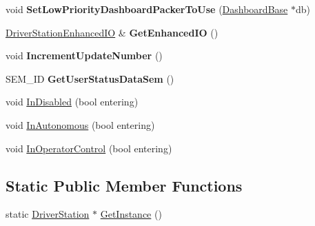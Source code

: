 \begin{DoxyCompactItemize}
\item 
\hypertarget{classDriverStation_a693f723f6be659c9385fad63c17d157d}{
void {\bfseries SetLowPriorityDashboardPackerToUse} (\hyperlink{classDashboardBase}{DashboardBase} $\ast$db)}
\label{classDriverStation_a693f723f6be659c9385fad63c17d157d}

\item 
\hypertarget{classDriverStation_a94c7b5fce697280e73b30dce57bbb917}{
\hyperlink{classDriverStationEnhancedIO}{DriverStationEnhancedIO} \& {\bfseries GetEnhancedIO} ()}
\label{classDriverStation_a94c7b5fce697280e73b30dce57bbb917}

\item 
\hypertarget{classDriverStation_a6984ff4cb46d315679ace551cb88c875}{
void {\bfseries IncrementUpdateNumber} ()}
\label{classDriverStation_a6984ff4cb46d315679ace551cb88c875}

\item 
\hypertarget{classDriverStation_a95bff259901c96256fa2f9daae5c404a}{
SEM\_\-ID {\bfseries GetUserStatusDataSem} ()}
\label{classDriverStation_a95bff259901c96256fa2f9daae5c404a}

\item 
void \hyperlink{classDriverStation_aa4dcf7380058351a899409956c2f4894}{InDisabled} (bool entering)
\item 
void \hyperlink{classDriverStation_a7900262f3e202b831340eee39ce00fee}{InAutonomous} (bool entering)
\item 
void \hyperlink{classDriverStation_abe59eecc8f79e13cc9524d9a4af1a853}{InOperatorControl} (bool entering)
\end{DoxyCompactItemize}
\subsection*{Static Public Member Functions}
\begin{DoxyCompactItemize}
\item 
static \hyperlink{classDriverStation}{DriverStation} $\ast$ \hyperlink{classDriverStation_ab0995c2d3f0b40cb13ac5aff656e46d0}{GetInstance} ()
\end{DoxyCompactItemize}
